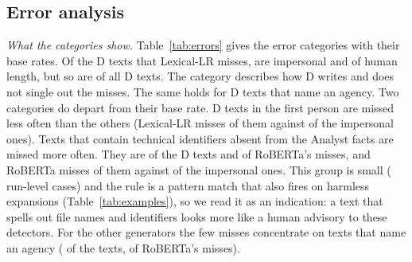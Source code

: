 \documentclass[journal]{IEEEtran}
\begin{document}
\subsection{Error analysis}\label{sec:erranalysis}
\emph{What the categories show.} Table~\ref{tab:errors} gives the error categories with their base rates. Of the D
texts that Lexical-LR misses, \ErrFnDImpersonalHumanLengthLexlr{} are impersonal and of human length, but so are
\ErrbaseFnDImpersonalHumanLength{} of all D texts. The category describes how D writes and does not single out the
misses. The same holds for D texts that name an agency. Two categories do depart from their base rate. D texts in
the first person are missed less often than the others (Lexical-LR misses \ErrRateFnDFirstPersonStillMissedLexlr{}
of them against \ErrRateFnDImpersonalHumanLengthLexlr{} of the impersonal ones). Texts that contain technical
identifiers absent from the Analyst facts are missed more often. They are \ErrbaseFnDUnsupportedTechnicalDetail{}
of the D texts and \ErrFnDUnsupportedTechnicalDetailTrans{} of RoBERTa's misses, and RoBERTa misses
\ErrRateFnDUnsupportedTechnicalDetailTrans{} of them against \ErrRateFnDImpersonalHumanLengthTrans{} of the
impersonal ones. This group is small (\ErrNFnDUnsupportedTechnicalDetailLexlr{} run-level cases) and the rule is a
pattern match that also fires on harmless expansions (Table~\ref{tab:examples}), so we read it as an indication:
a text that spells out file names and identifiers looks more like a human advisory to these detectors. For the other generators the few misses concentrate on
texts that name an agency (\ErrbaseFnOtherGeneratorsCitesAnAgency{} of the texts,
\ErrFnOtherGeneratorsCitesAnAgencyTrans{} of RoBERTa's misses).
\end{document}
